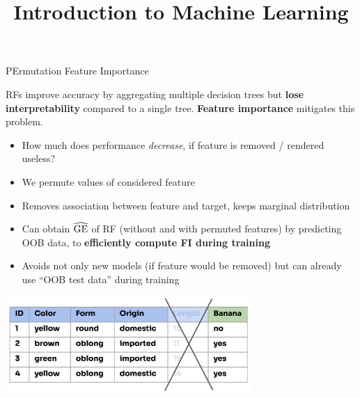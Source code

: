 \documentclass[11pt,compress,t,notes=noshow, xcolor=table]{beamer}
\title{Introduction to Machine Learning}
\begin{document}

\begin{frame2}[footnotesize]{PErmutation Feature Importance}


RFs improve accuracy by aggregating multiple decision trees but \textbf{lose interpretability} compared to a single tree. \textbf{Feature importance} mitigates this problem.
\begin{itemize}
  \item How much does performance \textit{decrease}, if feature is removed / rendered useless?
  \item We permute values of considered feature
  \item Removes association between feature and target, keeps marginal distribution
  \item Can obtain $\widehat{\mathrm{GE}}$ of RF (without and with permuted features)
    by predicting OOB data, to \textbf{efficiently compute FI during training}
  \item Avoids not only new models (if feature would be removed) but can already use ``OOB test data''
    during training
\end{itemize}

\vspace{-1ex}
\begin{center}
\includegraphics[width=0.7\textwidth]{figure_man/forest-fimp_idea.png}
\end{center}

\end{frame2}
\end{document}
